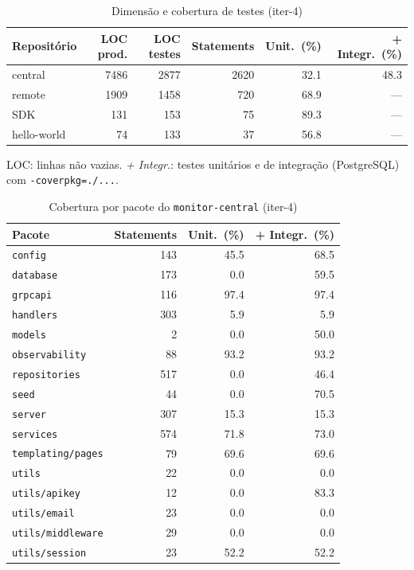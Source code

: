 \begin{table}[htbp]
  \centering\small
  \caption{Dimensão e cobertura de testes (iter-4)}
  \label{tab:iter-4-cobertura}
  \begin{tabular}{lrrrrr}
    \toprule
    Repositório & LOC prod. & LOC testes & Statements & Unit.\ (\%) & + Integr.\ (\%) \\
    \midrule
    central & 7486 & 2877 & 2620 & 32.1 & 48.3 \\
    remote & 1909 & 1458 & 720 & 68.9 & --- \\
    SDK & 131 & 153 & 75 & 89.3 & --- \\
    hello-world & 74 & 133 & 37 & 56.8 & --- \\
    \bottomrule
  \end{tabular}
  \par\smallskip\footnotesize LOC: linhas não vazias. \emph{+ Integr.}: testes unitários e de integração (PostgreSQL) com \texttt{-coverpkg=./...}.
\end{table}

\begin{table}[htbp]
  \centering\small
  \caption{Cobertura por pacote do \texttt{monitor-central} (iter-4)}
  \label{tab:iter-4-cobertura-central}
  \begin{tabular}{lrrr}
    \toprule
    Pacote & Statements & Unit.\ (\%) & + Integr.\ (\%) \\
    \midrule
    \texttt{config} & 143 & 45.5 & 68.5 \\
    \texttt{database} & 173 & 0.0 & 59.5 \\
    \texttt{grpcapi} & 116 & 97.4 & 97.4 \\
    \texttt{handlers} & 303 & 5.9 & 5.9 \\
    \texttt{models} & 2 & 0.0 & 50.0 \\
    \texttt{observability} & 88 & 93.2 & 93.2 \\
    \texttt{repositories} & 517 & 0.0 & 46.4 \\
    \texttt{seed} & 44 & 0.0 & 70.5 \\
    \texttt{server} & 307 & 15.3 & 15.3 \\
    \texttt{services} & 574 & 71.8 & 73.0 \\
    \texttt{templating/pages} & 79 & 69.6 & 69.6 \\
    \texttt{utils} & 22 & 0.0 & 0.0 \\
    \texttt{utils/apikey} & 12 & 0.0 & 83.3 \\
    \texttt{utils/email} & 23 & 0.0 & 0.0 \\
    \texttt{utils/middleware} & 29 & 0.0 & 0.0 \\
    \texttt{utils/session} & 23 & 52.2 & 52.2 \\
    \bottomrule
  \end{tabular}
\end{table}
